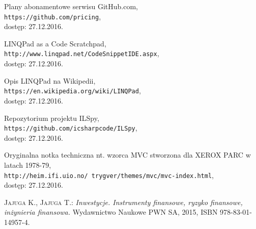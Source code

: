 \documentclass[a4paper,twoside,titlepage,openright]{book}
\begin{document}
\begin{thebibliography}{99}
 Plany abonamentowe serwisu GitHub.com, \\
\texttt{https://github.com/pricing}, \\dostęp: 27.12.2016.

 LINQPad as a Code Scratchpad, \\
\texttt{http://www.linqpad.net/CodeSnippetIDE.aspx}, \\dostęp: 27.12.2016.

 Opis LINQPad na Wikipedii, \\
\texttt{https://en.wikipedia.org/wiki/LINQPad}, \\dostęp: 27.12.2016.

 Repozytorium projektu ILSpy, \\
\texttt{https://github.com/icsharpcode/ILSpy}, \\dostęp: 27.12.2016.

 Oryginalna notka techniczna nt. wzorca MVC stworzona dla XEROX PARC w latach 1978-79, \\
\texttt{http://heim.ifi.uio.no/~trygver/themes/mvc/mvc-index.html}, \\dostęp: 27.12.2016.

 \textsc{Jajuga K., Jajuga T.:}
\textit{Inwestycje. Instrumenty finansowe, ryzyko finansowe, inżynieria finansowa.} Wydawnictwo Naukowe PWN SA, 2015, ISBN 978-83-01-14957-4.


\end{thebibliography}
\end{document}

